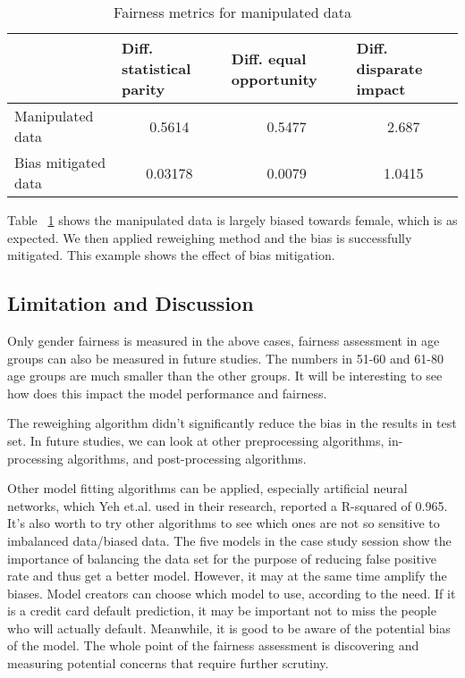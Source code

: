 \documentclass{article}
\begin{document}
\begin{table}[]
  \caption{Fairness metrics for manipulated data}
  \label{table8}
\centering
\begin{tabular}{|l|c|c|c|}
\hline
                    & \multicolumn{1}{l|}{Diff. statistical parity} & \multicolumn{1}{l|}{Diff. equal opportunity} & \multicolumn{1}{l|}{Diff. disparate impact} \\ \hline
Manipulated data    & 0.5614                                        & 0.5477                                       & 2.687                                       \\ \hline
Bias mitigated data & 0.03178                                       & 0.0079                                       & 1.0415                                      \\ \hline
\end{tabular}
\end{table}

Table ~\ref{table8} shows the manipulated data is largely biased towards female, which is as expected. We then applied reweighing method and the bias is successfully mitigated. This example shows the effect of bias mitigation. 

\subsection{Limitation and Discussion}
Only gender fairness is measured in the above cases, fairness assessment in age groups can also be measured in future studies. The numbers in 51-60 and 61-80 age groups are much smaller than the other groups. It will be interesting to see how does this impact the model performance and fairness.

 The reweighing algorithm didn't significantly reduce the bias in the results in test set. In future studies, we can look at other preprocessing algorithms, in-processing algorithms, and post-processing algorithms. 
 
Other model fitting algorithms can be applied, especially artificial neural networks, which Yeh et.al. used in their research, reported a R-squared of 0.965. It's also worth to try other algorithms to see which ones are not so sensitive to imbalanced data/biased data.
The five models in the case study session show the importance of balancing the data set for the purpose of reducing false positive rate and thus get a better model. However, it may at the same time amplify the biases. Model creators can choose which model to use, according to the need. If it is a credit card default prediction, it may be important not to miss the people who will actually default. Meanwhile, it is good to be aware of the potential bias of the model. The whole point of the fairness assessment is discovering and measuring potential concerns that require further scrutiny. 
\end{document}
